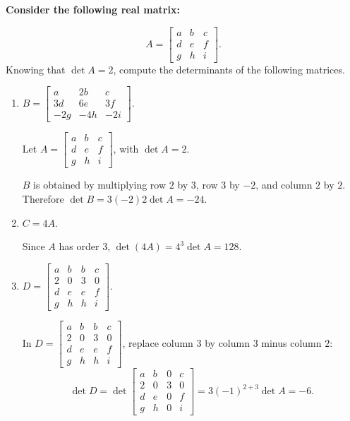 \providecommand{\rank}{\operatorname{r}}
\providecommand{\RR}{\mathbb R}
\providecommand{\CC}{\mathbb C}
\providecommand{\KK}{\mathbb K}

\setcounter{enumi}{47}
\item {\bfseries\boldmath
Consider the following real matrix:
}

\[
A=\begin{bmatrix}a&b&c\\d&e&f\\g&h&i\end{bmatrix}.
\]
Knowing that $\det A=2$, compute the determinants of the following matrices.

\begin{enumerate}[label=\alph*)]

\item $B=\begin{bmatrix}a&2b&c\\3d&6e&3f\\-2g&-4h&-2i\end{bmatrix}$.

\begin{answer}
Let $A=\begin{bmatrix}a&b&c\\d&e&f\\g&h&i\end{bmatrix}$, with $\det A=2$.

$B$ is obtained by multiplying row $2$ by $3$, row $3$ by $-2$,
and column $2$ by $2$. Therefore $\det B=3(-2)2\det A=-24$.
\end{answer}

\item $C=4A$.

\begin{answer}
Since $A$ has order $3$, $\det(4A)=4^3\det A=128$.
\end{answer}

\item $D=\begin{bmatrix}a&b&b&c\\2&0&3&0\\d&e&e&f\\g&h&h&i\end{bmatrix}$.

\begin{answer}
In
$D=\begin{bmatrix}a&b&b&c\\2&0&3&0\\d&e&e&f\\g&h&h&i\end{bmatrix}$,
replace column $3$ by column $3$ minus column $2$:
\[
 \det D=\det\begin{bmatrix}a&b&0&c\\2&0&3&0\\d&e&0&f\\g&h&0&i\end{bmatrix}
 =3(-1)^{2+3}\det A=-6.
\]
\end{answer}
\end{enumerate}
